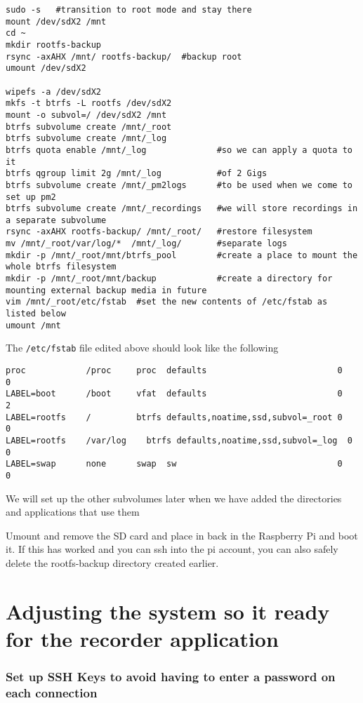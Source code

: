\documentclass[Draft]{akc}
\begin{document}
\begin{lstlisting}
sudo -s   #transition to root mode and stay there
mount /dev/sdX2 /mnt
cd ~
mkdir rootfs-backup
rsync -axAHX /mnt/ rootfs-backup/  #backup root
umount /dev/sdX2

wipefs -a /dev/sdX2
mkfs -t btrfs -L rootfs /dev/sdX2
mount -o subvol=/ /dev/sdX2 /mnt
btrfs subvolume create /mnt/_root
btrfs subvolume create /mnt/_log
btrfs quota enable /mnt/_log              #so we can apply a quota to it
btrfs qgroup limit 2g /mnt/_log           #of 2 Gigs
btrfs subvolume create /mnt/_pm2logs      #to be used when we come to set up pm2
btrfs subvolume create /mnt/_recordings   #we will store recordings in a separate subvolume
rsync -axAHX rootfs-backup/ /mnt/_root/   #restore filesystem
mv /mnt/_root/var/log/*  /mnt/_log/       #separate logs
mkdir -p /mnt/_root/mnt/btrfs_pool        #create a place to mount the whole btrfs filesystem
mkdir -p /mnt/_root/mnt/backup            #create a directory for mounting external backup media in future
vim /mnt/_root/etc/fstab  #set the new contents of /etc/fstab as listed below
umount /mnt
\end{lstlisting}

The \texttt{/etc/fstab} file edited above should look like the following

\begin{lstlisting}
proc            /proc     proc  defaults                          0    0
LABEL=boot      /boot     vfat  defaults                          0    2
LABEL=rootfs    /         btrfs defaults,noatime,ssd,subvol=_root 0    0
LABEL=rootfs    /var/log	btrfs defaults,noatime,ssd,subvol=_log  0    0
LABEL=swap      none      swap  sw                                0    0
\end{lstlisting}

We will set up the other subvolumes later when we have added the directories and
applications that use them

Umount and remove the SD card and place in back in the Raspberry Pi and boot it.  If this has worked and you can ssh into the pi
account, you can also safely delete the rootfs-backup directory created earlier.

\section{Adjusting the system so it ready for the recorder application}

\subsubsection{Set up SSH Keys to avoid having to enter a password on each connection}
\end{document}
